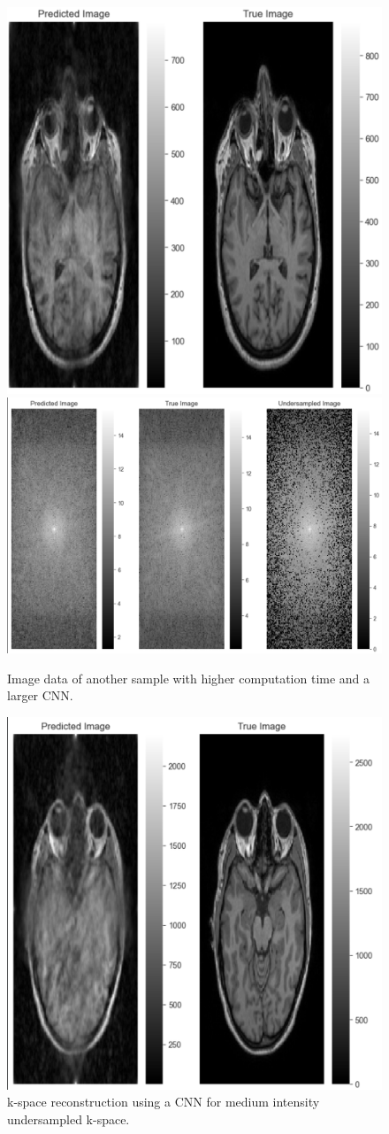 \documentclass[14pt]{extreport}
\begin{document}
        \begin{figure}[h]
            \centering
            \includegraphics[width=0.39\linewidth]{CNN_1.png}
            \includegraphics[width = 0.58\linewidth]{CNN_1_kspace.png}
            \caption{Image data of another sample with higher computation time and a larger CNN.}
            \label{img:CNN_1}
        \end{figure}

        \begin{figure}[h]
            \centering
            \includegraphics[width=0.5\linewidth]{Image-1.png}
            \caption{k-space reconstruction using a CNN for medium intensity undersampled k-space.}
            \label{img:image-2}
        \end{figure}
\end{document}

